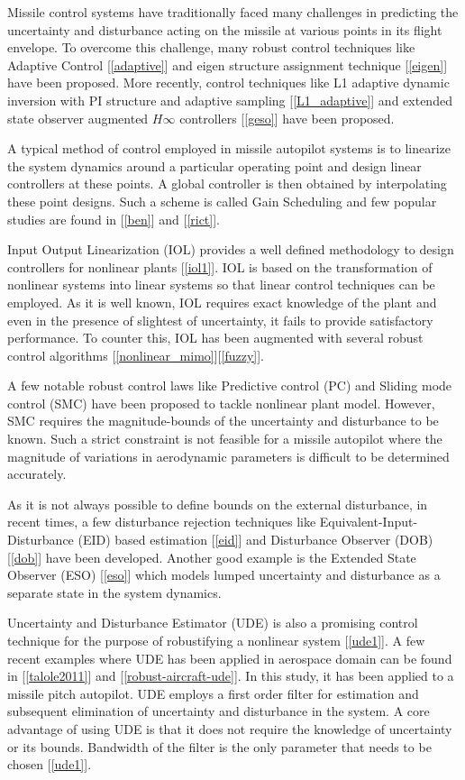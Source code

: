 \documentclass[conference]{IEEEtran}
\begin{document}
	Missile control systems have traditionally faced many challenges in predicting the uncertainty and disturbance acting on the missile at various points in its flight envelope. To overcome this challenge, many robust control techniques like Adaptive Control [\ref{adaptive}] and eigen structure assignment technique [\ref{eigen}] have been proposed. More recently, control techniques like L1 adaptive dynamic inversion with PI structure and adaptive sampling [\ref{L1_adaptive}] and extended state observer augmented $H\infty$ controllers [\ref{geso}] have been proposed. 
	
	A typical method of control employed in missile autopilot systems is to linearize the system dynamics around a particular operating point and design linear controllers at these points. A global controller is then obtained by interpolating these point designs. Such a scheme is called Gain Scheduling and few popular studies are found in [\ref{ben}] and [\ref{rict}]. 
	
	Input Output Linearization (IOL) provides a well defined methodology to design controllers for nonlinear plants [\ref{iol1}]. IOL is based on the transformation of nonlinear systems into linear systems so that linear control techniques can be employed. As it is well known, IOL requires exact knowledge of the plant and even in the presence of slightest of uncertainty, it fails to provide satisfactory performance. To counter this, IOL has been augmented with several robust control algorithms [\ref{nonlinear_mimo}][\ref{fuzzy}].
	
	A few notable robust control laws like Predictive control (PC) and Sliding mode control (SMC) have been proposed to tackle nonlinear plant model. However, SMC requires the magnitude-bounds of the uncertainty and disturbance to be known. Such a strict constraint is not feasible  for a missile autopilot where the magnitude of variations in aerodynamic parameters is difficult to be determined accurately.  
	
	As it is not always possible to define bounds on the external disturbance, in recent times, a few disturbance rejection techniques like Equivalent-Input-Disturbance (EID) based estimation [\ref{eid}] and Disturbance Observer (DOB) [\ref{dob}] have been developed. Another good example is the Extended State Observer (ESO) [\ref{eso}] which models lumped uncertainty and disturbance as a separate state in the system dynamics. 
	
	Uncertainty and Disturbance Estimator (UDE) is also a promising control technique for the purpose of robustifying a nonlinear system [\ref{ude1}]. A few recent examples where UDE has been applied in aerospace domain can be found in [\ref{talole2011}] and [\ref{robust-aircraft-ude}]. In this study, it has been applied to a missile pitch autopilot. UDE employs a first order filter for estimation and subsequent elimination of uncertainty and disturbance in the system. A core advantage of using UDE is that it does not require the knowledge of uncertainty or its bounds. Bandwidth of the filter is the only parameter that needs to be chosen [\ref{ude1}].
	
\end{document}
